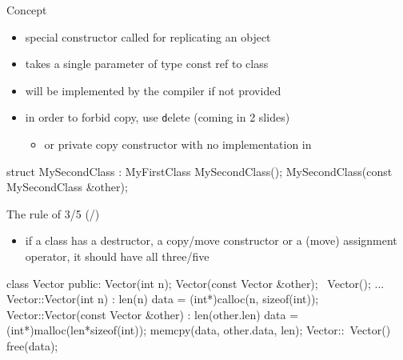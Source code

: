 \begin{frame}[fragile]
  \begin{block}{Concept}
    \begin{itemize}
    \item special constructor called for replicating an object
    \item takes a single parameter of type const ref to class
    \item will be implemented by the compiler if not provided
    \item in order to forbid copy, use {\texttt delete} (coming in 2 slides)
      \begin{itemize}
      \item or private copy constructor with no implementation in 
      \end{itemize}
    \end{itemize}
  \end{block}
  \pause
  \begin{cppcode}
    struct MySecondClass : MyFirstClass {
      MySecondClass();
      MySecondClass(const MySecondClass &other);
    }    
  \end{cppcode}
  \pause
  \begin{exampleblock}{The rule of 3/5 (/)}
    \begin{itemize}
    \item if a class has a destructor, a copy/move constructor or a (move) assignment operator, it should have all three/five
    \end{itemize}
  \end{exampleblock}
\end{frame}

\begin{frame}[fragile]
  \begin{cppcode}
    class Vector {
    public:
      Vector(int n);
      Vector(const Vector &other);
      ~Vector();
      ...
    }
    Vector::Vector(int n) : len(n) {
      data = (int*)calloc(n, sizeof(int));
    }
    Vector::Vector(const Vector &other) : len(other.len) {
      data = (int*)malloc(len*sizeof(int));
      memcpy(data, other.data, len);
    }
    Vector::~Vector() { free(data); }
  \end{cppcode}
\end{frame}

